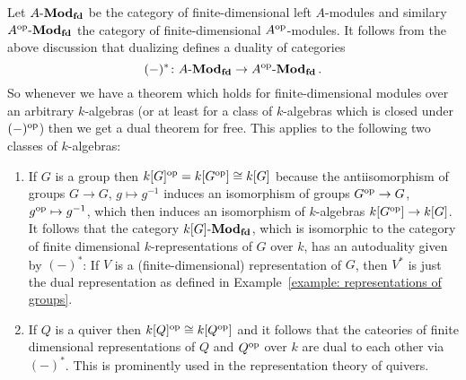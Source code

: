 \begin{example}
  Let $A\text{-}\mathbf{Mod}_{\mathbf{fd}}$ be the category of finite-dimensional left $A$-modules and similary $A^{\operatorname{op}}\text{-}\mathbf{Mod}_{\mathbf{fd}}$ the category of finite-dimensional $A^{\operatorname{op}}$-modules.
  It follows from the above discussion that dualizing defines a duality of categories
  \[
            (-)^*
    \colon  A\text{-}\mathbf{Mod}_{\mathbf{fd}}
    \to     A^{\operatorname{op}}\text{-}\mathbf{Mod}_{\mathbf{fd}} \,.
  \]
  So whenever we have a theorem which holds for finite-dimensional modules over an arbitrary $k$-algebras (or at least for a class of $k$-algebras which is closed under $(-)^{\operatorname{op}}$) then we get a dual theorem for free.
  This applies to the following two classes of $k$-algebras:
  \begin{enumerate}
    \item
      If $G$ is a group then $k[G]^{\operatorname{op}} = k[G^{\operatorname{op}}] \cong k[G]$ because the antiisomorphism of groups $G \to G$, $g \mapsto g^{-1}$ induces an isomorphism of groups $G^{\operatorname{op}} \to G$, $g^{\operatorname{op}} \mapsto g^{-1}$, which then induces an isomorphism of $k$-algebras $k[G^{\operatorname{op}}] \to k[G]$.
      It follows that the category $k[G]\text{-}\mathbf{Mod}_{\mathbf{fd}}$, which is isomorphic to the category of finite dimensional $k$-representations of $G$ over $k$, has an autoduality given by $(-)^*$:
      If $V$ is a (finite-dimensional) representation of $G$, then $V^*$ is just the dual representation as defined in Example~\ref{example: representations of groups}.
    \item
      If $Q$ is a quiver then $k[Q]^{\operatorname{op}} \cong k[Q^{\operatorname{op}}]$ and it follows that the cateories of finite dimensional representations of $Q$ and $Q^{\operatorname{op}}$ over $k$ are dual to each other via $(-)^*$.
      This is prominently used in the representation theory of quivers.
  \end{enumerate}
\end{example}




